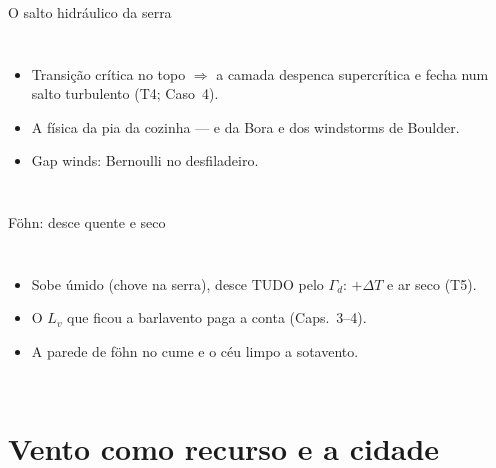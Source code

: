 \documentclass[aspectratio=169,11pt]{beamer}
\begin{document}
\begin{frame}{O salto hidráulico da serra}
  \begin{columns}
    \vspace{0.4em}
    \begin{itemize}
      \item Transição crítica no topo $\Rightarrow$ a camada
            despenca supercrítica e fecha num salto turbulento (T4;
            Caso~4).
      \item A física da pia da cozinha — e da Bora e dos windstorms
            de Boulder.
      \item Gap winds: Bernoulli no desfiladeiro.
    \end{itemize}
  \end{columns}
\end{frame}

\begin{frame}{Föhn: desce quente e seco}
  \begin{columns}
    \begin{itemize}
      \item Sobe úmido (chove na serra), desce TUDO pelo
            $\Gamma_d$: $+\Delta T$ e ar seco (T5).
      \item O $L_v$ que ficou a barlavento paga a conta (Caps.~3--4).
      \item A parede de föhn no cume e o céu limpo a sotavento.
    \end{itemize}
  \end{columns}
\end{frame}

\section{Vento como recurso e a cidade}
\end{document}

